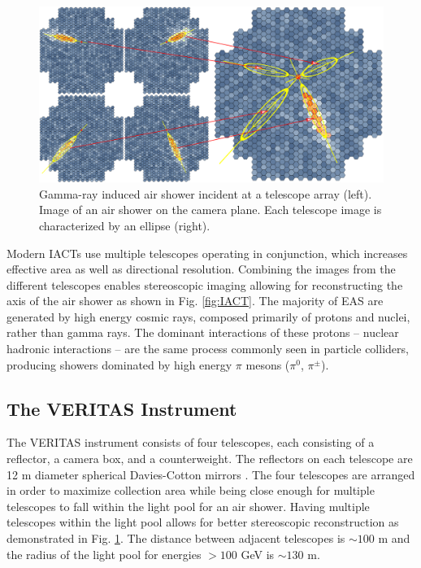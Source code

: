\documentclass[main.tex]{subfiles}
\begin{document}
\begin{figure}[htbp]
  \centering
  \includegraphics[width=0.96\linewidth]{images/Stereo}
  \caption[Gamma-ray EAS at a telescope array.]{Gamma-ray induced air shower incident at a telescope array (left). Image of an air shower on the camera plane. Each telescope image is characterized by an ellipse (right).}
  \label{fig:camera_face}
\end{figure}

Modern IACTs use multiple telescopes operating in conjunction, which increases effective area as well as directional resolution. Combining the images from the different telescopes enables stereoscopic imaging allowing for reconstructing the axis of the air shower as shown in Fig. \ref{fig:IACT}. The majority of EAS are generated by high energy cosmic rays, composed primarily of protons and nuclei, rather than gamma rays. The dominant interactions of these protons -- nuclear hadronic interactions -- are the same process commonly seen in particle colliders, producing showers dominated by high energy $\pi$ mesons ($\pi^0$, $\pi^\pm$).
\subsection{The VERITAS Instrument}
The VERITAS instrument consists of four telescopes, each consisting of a reflector, a camera box, and a counterweight. The reflectors on each telescope are 12 m diameter spherical Davies-Cotton mirrors \cite{DaviesCotton}. The four telescopes are arranged in order to maximize collection area while being close enough for multiple telescopes to fall within the light pool for an air shower. Having multiple telescopes within the light pool allows for better stereoscopic reconstruction as demonstrated in Fig. \ref{fig:camera_face}. The distance between adjacent telescopes is $\sim 100$ m and the radius of the light pool for energies $>100$ GeV is $\sim 130$ m.\par
\end{document}
